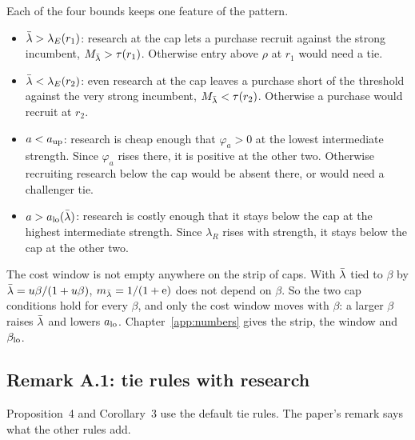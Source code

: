 Each of the four bounds keeps one feature of the pattern.
\begin{itemize}
\item \(\bar\lambda>\lambda_E(r_1)\): research at the cap lets a purchase recruit against the strong incumbent,
\(M_{\bar\lambda}>\tau(r_1)\). Otherwise entry above \(\rho\) at \(r_1\) would need a tie.
\item \(\bar\lambda<\lambda_E(r_2)\): even research at the cap leaves a purchase short of the threshold against the very strong
incumbent, \(M_{\bar\lambda}<\tau(r_2)\). Otherwise a purchase would recruit at \(r_2\).
\item \(a<a_{\rm up}\): research is cheap enough that \(\varphi_a>0\) at the lowest intermediate strength. Since
\(\varphi_a\) rises there, it is positive at the other two. Otherwise recruiting research below the cap would be absent
there, or would need a challenger tie.
\item \(a>a_{\rm lo}(\bar\lambda)\): research is costly enough that it stays below the cap at the highest intermediate strength.
Since \(\lambda_R\) rises with strength, it stays below the cap at the other two.
\end{itemize}
The cost window is not empty anywhere on the strip of caps. With \(\bar\lambda\) tied to \(\beta\) by \(\bar\lambda=u\beta/(1+u\beta)\),
\(m_{\bar\lambda}=1/(1+\mathrm{e})\) does not depend on \(\beta\). So the two cap conditions hold for every \(\beta\), and only the cost
window moves with \(\beta\): a larger \(\beta\) raises \(\bar\lambda\) and lowers \(a_{\rm lo}\). Chapter~\ref{app:numbers}
gives the strip, the window and \(\beta_{\rm lo}\).

\subsection{Remark A.1: tie rules with research}

Proposition~4 and Corollary~3 use the default tie rules. The paper's remark says what the other rules add.

